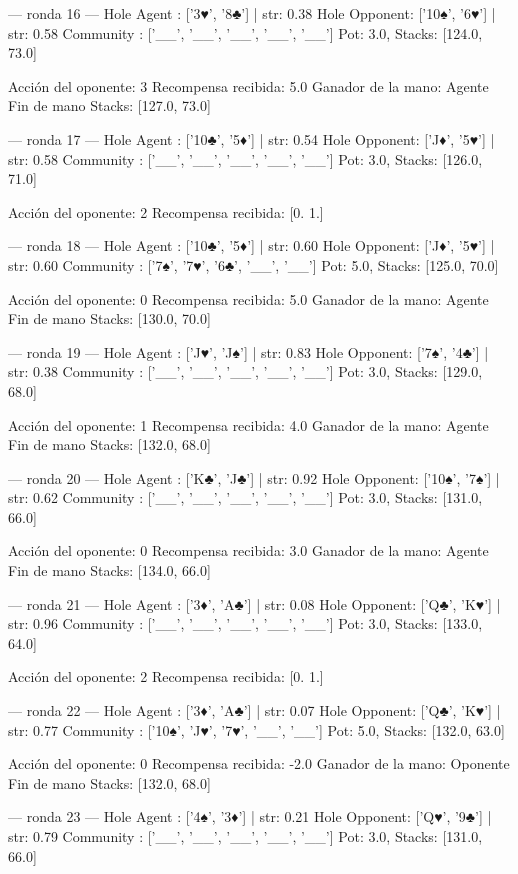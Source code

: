 --- ronda 16 ---
Hole Agent : ['3♥', '8♣'] | str: 0.38
Hole Opponent: ['10♠', '6♥'] | str: 0.58
Community  : ['__', '__', '__', '__', '__']
Pot: 3.0, Stacks: [124.0, 73.0]

Acción del oponente: 3
Recompensa recibida: 5.0
Ganador de la mano: Agente
Fin de mano Stacks: [127.0, 73.0]


--- ronda 17 ---
Hole Agent : ['10♣', '5♦'] | str: 0.54
Hole Opponent: ['J♦', '5♥'] | str: 0.58
Community  : ['__', '__', '__', '__', '__']
Pot: 3.0, Stacks: [126.0, 71.0]

Acción del oponente: 2
Recompensa recibida: [0. 1.]

--- ronda 18 ---
Hole Agent : ['10♣', '5♦'] | str: 0.60
Hole Opponent: ['J♦', '5♥'] | str: 0.60
Community  : ['7♠', '7♥', '6♣', '__', '__']
Pot: 5.0, Stacks: [125.0, 70.0]

Acción del oponente: 0
Recompensa recibida: 5.0
Ganador de la mano: Agente
Fin de mano Stacks: [130.0, 70.0]


--- ronda 19 ---
Hole Agent : ['J♥', 'J♠'] | str: 0.83
Hole Opponent: ['7♠', '4♣'] | str: 0.38
Community  : ['__', '__', '__', '__', '__']
Pot: 3.0, Stacks: [129.0, 68.0]

Acción del oponente: 1
Recompensa recibida: 4.0
Ganador de la mano: Agente
Fin de mano Stacks: [132.0, 68.0]


--- ronda 20 ---
Hole Agent : ['K♣', 'J♣'] | str: 0.92
Hole Opponent: ['10♠', '7♠'] | str: 0.62
Community  : ['__', '__', '__', '__', '__']
Pot: 3.0, Stacks: [131.0, 66.0]

Acción del oponente: 0
Recompensa recibida: 3.0
Ganador de la mano: Agente
Fin de mano Stacks: [134.0, 66.0]


--- ronda 21 ---
Hole Agent : ['3♦', 'A♣'] | str: 0.08
Hole Opponent: ['Q♣', 'K♥'] | str: 0.96
Community  : ['__', '__', '__', '__', '__']
Pot: 3.0, Stacks: [133.0, 64.0]

Acción del oponente: 2
Recompensa recibida: [0. 1.]

--- ronda 22 ---
Hole Agent : ['3♦', 'A♣'] | str: 0.07
Hole Opponent: ['Q♣', 'K♥'] | str: 0.77
Community  : ['10♠', 'J♥', '7♥', '__', '__']
Pot: 5.0, Stacks: [132.0, 63.0]

Acción del oponente: 0
Recompensa recibida: -2.0
Ganador de la mano: Oponente
Fin de mano Stacks: [132.0, 68.0]


--- ronda 23 ---
Hole Agent : ['4♠', '3♦'] | str: 0.21
Hole Opponent: ['Q♥', '9♣'] | str: 0.79
Community  : ['__', '__', '__', '__', '__']
Pot: 3.0, Stacks: [131.0, 66.0]

